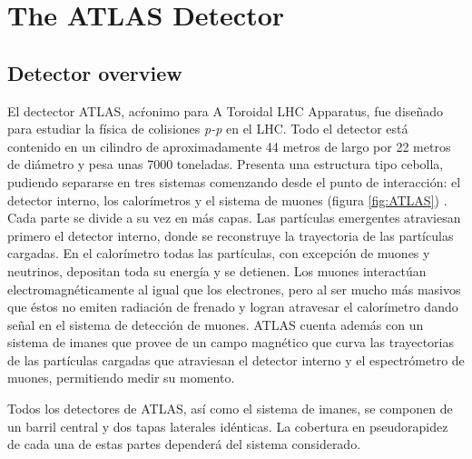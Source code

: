 \section{The ATLAS Detector}

\subsection{Detector overview}\label{sec:atlassummary}
El dectector ATLAS, ac\'ronimo para A Toroidal LHC Apparatus, fue dise\~nado para estudiar la f\'isica de colisiones \emph{p-p} en el LHC. Todo el detector est\'a contenido en un cilindro de aproximadamente 44 metros de largo por 22 metros de di\'ametro y pesa unas 7000 toneladas\cite{TDR}.  Presenta una estructura tipo cebolla, pudiendo separarse en tres sistemas comenzando desde el punto de interacci\'on: el detector interno, los calor\'imetros y el sistema de muones (figura \ref{fig:ATLAS}) . Cada parte se divide a su vez en m\'as capas. Las part\'iculas emergentes atraviesan primero el detector interno, donde se reconstruye la trayectoria de las part\'iculas cargadas. En el calor\'imetro todas las part\'iculas, con excepci\'on de muones y neutrinos, depositan toda su energ\'ia y se detienen. Los muones interact\'uan electromagn\'eticamente al igual que los electrones, pero al ser mucho m\'as masivos que \'estos no emiten radiaci\'on de frenado y logran atravesar el calor\'imetro dando se\~nal en el sistema de detecci\'on de muones. ATLAS cuenta adem\'as con un sistema de imanes que provee de un campo magn\'etico que curva las trayectorias de las part\'iculas cargadas que atraviesan el detector interno y el espectr\'ometro de muones, permitiendo medir su momento.

   Todos los detectores de ATLAS, as\'i como el sistema de imanes, se componen de un barril central y dos tapas laterales id\'enticas. La cobertura en pseudorapidez de cada una de estas partes depender\'a del sistema considerado.

